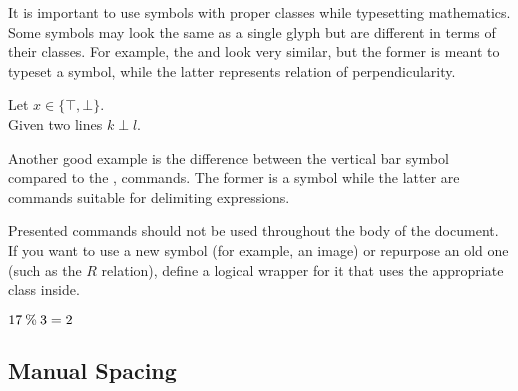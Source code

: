 It is important to use symbols with proper classes while typesetting
mathematics. Some symbols may look the same as a single glyph but are different
in terms of their classes. For example, the  and  look very
similar, but the former is meant to typeset a symbol, while the latter
represents relation of perpendicularity.
\begin{example}
Let \(x \in \{\top, \bot\}\).
\\ %
Given two lines \(k \perp l\).
\end{example}
Another good example is the difference between the vertical bar symbol \ai{|}
compared to the ,  commands. The former is a symbol while
the latter are commands suitable for delimiting expressions.

Presented commands should not be used throughout the body of the document. If
you want to use a new symbol (for example, an image) or repurpose an old one (such
as the \(R\) relation), define a logical wrapper for it that uses the
appropriate class inside.
\begin{example}
\NewDocumentCommand{\modulo}{}{%
  \mathbin{\%}%
}
\( 17 \modulo 3 = 2 \)
\end{example}

\subsection{Manual Spacing}

